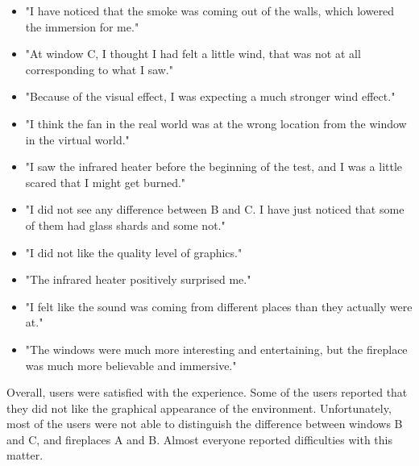\begin{itemize}

\item "I have noticed that the smoke was coming out of the walls, which
lowered the immersion for me."

\item "At window C, I thought I had felt a little wind,
that was not at all corresponding to what I saw."

\item "Because of the visual effect, I was expecting a much stronger wind
effect."

\item "I think the fan in the real world was at the wrong location from the
window in the virtual world."

\item "I saw the infrared heater before the beginning of the test, and I was
a little scared that I might get burned."

\item "I did not see any difference between B and C. I have just noticed that
some of them had glass shards and some not."

\item "I did not like the quality level of graphics."

\item "The infrared heater positively surprised me."

\item "I felt like the sound was coming from different places than they actually
were at."

\item "The windows were much more interesting and entertaining, but the fireplace
was much more believable and immersive."

\end{itemize}


Overall, users were satisfied with the experience. Some of the users reported
that they did not like the graphical appearance of the environment.
Unfortunately, most of the users were not able to distinguish the difference
between windows B and C, and fireplaces A and B. Almost everyone reported
difficulties with this matter.